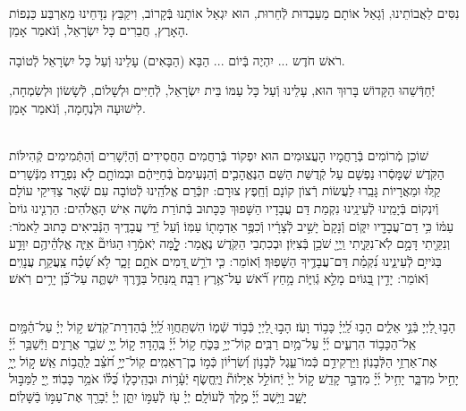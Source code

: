 \documentclass[twoside, openany, parskip=half, 11pt]{book}
\begin{document}
\\
נִסִּים לַאֲבוֹתֵינוּ, וְֿגָאַל אוֹתָם מֵעַבְדוּת לְֿחֵרוּת, הוּא יִגְאַל אוֹתָנוּ בְּֿקָרוֹב, וִיקַבֵּץ נִדָּחֵינוּ מֵאַרְבַּע כַּנְפוֹת הָאָרֶץ, חֲבֵרִים כָּל יִשְׂרָאֵל, וְֿנֹאמַר אָמֵן.

רֹאשׁ חֹדֶש ... יִהְיֶה בְּֿיוֹם ... הַבָּא (הַבָּאִים) עָלֵינוּ וְֿעַל כָּל יִשְׂרָאֵל לְֿטוֹבָה.

יְֿחַדְּֿשֵׁהוּ הַקָּדוֹשׁ בָּרוּךְ הוּא, עָלֵינוּ וְֿעַל כָּל עַמּוֹ בֵּית יִשְׂרָאֵל, לְֿחַיִּים וּלְשָׁלוֹם, לְֿשָׂשׂוֹן וּלְשִׂמְחָה, לִישׁוּעָה וּלְנֶחָמָה, וְֿנֹאמַר אָמֵן.

\sepline

\vspace{-0.5\baselineskip}
\ashrei

\begin{sometimes}

\\
שׁוֹכֵן מְֿרוֹמִים בְּֿרַחֲמָיו הָעֲצוּמִים הוּא יִפְקוֹד בְּֿרַחֲמִים הַחֲסִידִים וְֿהַיְֿשָׁרִים וְֿהַתְּֿמִימִים קְֿהִילּוֹת הַקֹּֽדֶשׁ שֶׁמָּסְֿרוּ נַפְשָׁם עַל קְֿדֻשַּׁת הַשֵּׁם הַנֶּאֱהָבִ֤ים וְֿהַנְּעִימִם֙ בְּֿחַיֵּיהֶ֔ם וּבְמוֹתָ֖ם לֹ֣א נִפְרָ֑דוּ׃ מִנְּֿשָׁרִים קַֽלּוּ וּמֵאֲרָיוֹת גָּבֵֽרוּ לַעֲשׂוֹת רְֿצוֹן קוֹנָם וְֿחֵֽפֶץ צוּרָם: יִזְכְּֿרֵם אֱלֹהֵֽינוּ לְֿטוֹבָה עִם שְֿׁאָר צַדִּיקֵי עוֹלָם וְֿיִנְקוֹם בְּֿיָמֵֽינוּ לְֿעֵינֵֽינוּ נִקְמַת דַּם עֲבָדָיו הַשָּׁפוּךְ כַּכָּתוּב בְּֿתוֹרַת מֹשֶׁה אִישׁ הָאֱלֹהִים: הַרְנִ֤ינוּ גוֹיִם֙ עַמּ֔וֹ כִּ֥י דַם־עֲבָדָ֖יו יִקּ֑וֹם וְֿנָקָם֙ יָשִׁ֣יב לְֿצָרָ֔יו וְֿכִפֶּ֥ר אַדְמָת֖וֹ עַמּֽוֹ׃ וְֿעַל יְֿדֵי עֲבָדֶֽיךָ הַנְּֿבִיאִים כָּתוּב לֵאמֹר: וְנִקֵּ֖יתִי דָּמָ֣ם לֹֽא־נִקֵּ֑יתִי וַֽיְיָ֖ שֹׁכֵ֥ן בְּֿצִיּֽוֹן׃ וּבְכִתְבֵי הַקֹּֽדֶשׁ נֶאֱמַר: לׇׇׇָ֤מָּה יֹֽאמְֿר֣וּ הַגּוֹיִם֘ אַיֵּ֢ה אֱלֹֽהֵ֫יהֶ֥ם יִוָּדַ֣ע בַּגֹּייִ֣ם לְֿעֵינֵ֑ינוּ נִ֝קְמַ֗ת דַּם־עֲבָדֶ֥יךָ הַשָּׁפֽוּךְ׃ וְֿאוֹמֵר: כִּ֤י דֹרֵ֣שׁ דָּ֭מִים אֹתָ֣ם זָכָ֑ר לֹ֥א שָׁ֝כַ֗ח צַֽעֲקַ֥ת עֲנָוִֽים׃ וְֿאוֹמֵר: יָדִ֣ין בַּ֭גּוֹיִם מָלֵ֣א גְֿוִיּ֑וֹת מָ֥חַץ רֹ֝֗אשׁ עַל־אֶ֥רֶץ רַבָּֽה׃ מִ֭נַּחַל בַּדֶּ֣רֶךְ יִשְׁתֶּ֑ה עַל־כֵּ֝֗ן יָרִ֥ים רֹֽאשׁ׃

\end{sometimes}


\yehalelu

\\
%
הָב֣וּ לַ֭יְיָ בְּֿנֵ֣י אֵלִ֑ים הָב֥וּ לַֽ֝יְיָ֗ כָּב֥וֹד וָעֹֽז׃
הָב֣וּ לַ֭יְיָ כְּֿב֣וֹד שְֿׁמ֑וֹ הִשְׁתַּֽחֲו֥וּ לַֽ֝יְיָ֗ בְּֿהַדְרַת־קֹֽדֶשׁ׃
ק֥וֹל יְיָ֗ עַל־הַ֫מָּ֥יִם אֵֽל־הַכָּב֥וֹד הִרְעִ֑ים יְ֜יָ֗ עַל־מַ֥יִם רַבִּֽים׃
קֽוֹל־יְיָ֥ בַּכֹּ֑חַ ק֥וֹל יְ֜יָ֗ בֶּֽהָדָר׃
ק֣וֹל יְ֖יָ֥ שֹׁבֵ֣ר אֲרָזִ֑ים וַיְֿשַׁבֵּ֥ר יְ֜יָ֗ אֶת־אַרְזֵ֥י הַלְּֿבָנֽוֹן׃
וַיַּרְקִידֵ֥ם כְּֿמוֹ־עֵ֑גֶל לְֿבָנ֥וֹן וְֿ֝שִׂרְי֗וֹן כְּֿמ֣וֹ בֶן־רְאֵמִֽים׃
קֽוֹל־יְיָ֥ חֹ֝צֵ֗ב לַֽהֲב֥וֹת אֵֽשׁ׃
ק֣וֹל יְ֖יָ֥ יָחִ֣יל מִדְבָּ֑ר יָחִ֥יל יְ֜יָ֗ מִדְבַּ֣ר קָדֵֽשׁ׃
ק֣וֹל יְיָ֙ יְֿחוֹלֵ֣ל אַיָּלוֹת֘ וַיֶּֽחֱשׂ֢ף יְֿעָ֫ר֥וֹת וּבְהֵֽיכָל֑וֹ כֻּ֝לּ֗וֹ אֹמֵ֥ר כָּבֽוֹד׃
יְ֖יָ לַמַּבּ֣וּל יָשָׁ֑ב וַיֵּ֥שֶׁב יְ֜יָ֗ מֶ֣לֶךְ לְֿעוֹלָֽם׃
יְיָ֗ עֹ֖ז לְֿעַמּ֣וֹ יִתֵּ֑ן יְיָ֓ יְֿבָרֵ֖ךְ אֶת־עַמּ֣וֹ בַֿשָּׁלֽוֹם׃
\end{document}
